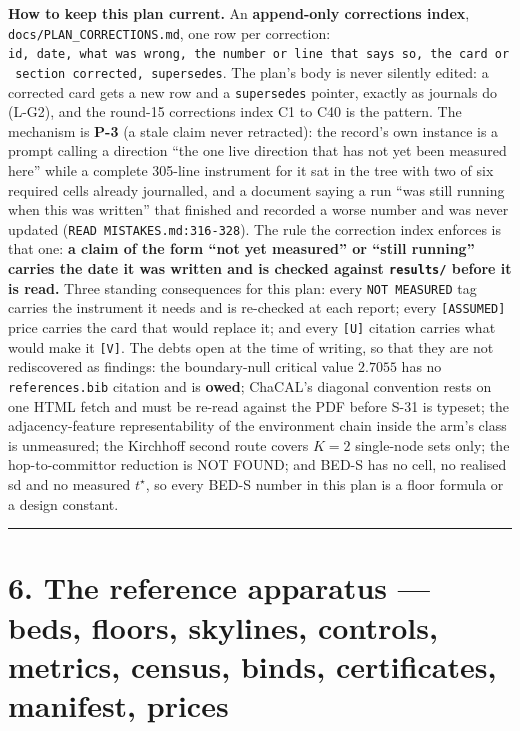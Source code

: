 \documentclass[11pt,a4paper]{article}
\theoremstyle{plain}
\theoremstyle{definition}
\theoremstyle{remark}
\begin{document}
\textbf{How to keep this plan current.} An \textbf{append-only
corrections index}, \texttt{docs/PLAN\_CORRECTIONS.md}, one row per
correction:
\texttt{id,\ date,\ what\ was\ wrong,\ the\ number\ or\ line\ that\ says\ so,\ the\ card\ or\ section\ corrected,\ supersedes}.
The plan's body is never silently edited: a corrected card gets a new
row and a \texttt{supersedes} pointer, exactly as journals do (L-G2),
and the round-15 corrections index C1 to C40 is the pattern. The
mechanism is \textbf{P-3} (a stale claim never retracted): the record's
own instance is a prompt calling a direction ``the one live direction
that has not yet been measured here'' while a complete 305-line
instrument for it sat in the tree with two of six required cells already
journalled, and a document saying a run ``was still running when this
was written'' that finished and recorded a worse number and was never
updated (\texttt{READ\ MISTAKES.md:316-328}). The rule the correction
index enforces is that one: \textbf{a claim of the form ``not yet
measured'' or ``still running'' carries the date it was written and is
checked against \texttt{results/} before it is read.} Three standing
consequences for this plan: every \texttt{NOT\ MEASURED} tag carries the
instrument it needs and is re-checked at each report; every
\texttt{{[}ASSUMED{]}} price carries the card that would replace it; and
every \texttt{{[}U{]}} citation carries what would make it
\texttt{{[}V{]}}. The debts open at the time of writing, so that they
are not rediscovered as findings: the boundary-null critical value
\(2.7055\) has no \texttt{references.bib} citation and is \textbf{owed};
ChaCAL's diagonal convention rests on one HTML fetch and must be re-read
against the PDF before S-31 is typeset; the adjacency-feature
representability of the environment chain inside the arm's class is
unmeasured; the Kirchhoff second route covers \(K=2\) single-node sets
only; the hop-to-committor reduction is NOT FOUND; and BED-S has no
cell, no realised sd and no measured \(t^\star\), so every BED-S number
in this plan is a floor formula or a design constant.

\begin{center}\rule{0.5\linewidth}{0.5pt}\end{center}

\section{6. The reference apparatus --- beds, floors, skylines,
controls, metrics, census, binds, certificates, manifest,
prices}\label{the-reference-apparatus-beds-floors-skylines-controls-metrics-census-binds-certificates-manifest-prices}
\end{document}
